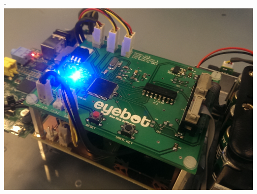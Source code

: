 \begin{titlingpage}
\begin{adjustwidth}{\unitlength}{-\unitlength}
\includegraphics[width=\textwidth]{resources/eyebot}

 \end{adjustwidth}
 
 \clearpage
 

\end{titlingpage}
